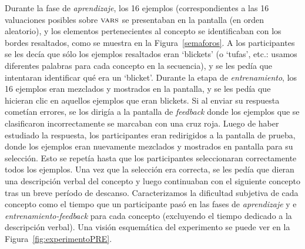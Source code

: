 Durante la fase de {\em aprendizaje}, los 16 ejemplos (correspondientes a las 16 valuaciones posibles sobre $\textsc{vars}$ se presentaban en la pantalla (en orden aleatorio), y los elementos pertenecientes al concepto se identificaban con los bordes resaltados, como se muestra en la Figura~\ref{semaforos}. A los participantes se les decía que sólo los ejemplos resaltados eran `blickets' (o `tufas', etc.: usamos diferentes palabras para cada concepto en la secuencia), y se les pedía que intentaran identificar qué era un `blicket'. Durante la etapa de {\em entrenamiento}, los 16 ejemplos eran mezclados y mostrados en la pantalla, y se les pedía que hicieran clic en aquellos ejemplos que eran blickets. Si al enviar su respuesta cometían errores, se los dirigía a la pantalla de {\em feedback} donde los ejemplos que se clasificaron incorrectamente se marcaban con una cruz roja. Luego de haber estudiado la respuesta, los participantes eran redirigidos a la pantalla de prueba, donde los ejemplos eran nuevamente mezclados y mostrados en pantalla para su selección. Esto se repetía hasta que los participantes seleccionaran correctamente todos los ejemplos. Una vez que la selección era correcta, se les pedía que dieran una descripción verbal del concepto y luego continuaban con el siguiente concepto tras un breve período de descanso. Caracterizamos la dificultad subjetiva de cada concepto como el tiempo que un participante pasó en las fases de {\em aprendizaje} y e {\em entrenamiento-feedback} para cada concepto (excluyendo el tiempo dedicado a la descripción verbal). Una visión esquemática del experimento se puede ver en la Figura~\ref{fig:experimentoPRE}.

